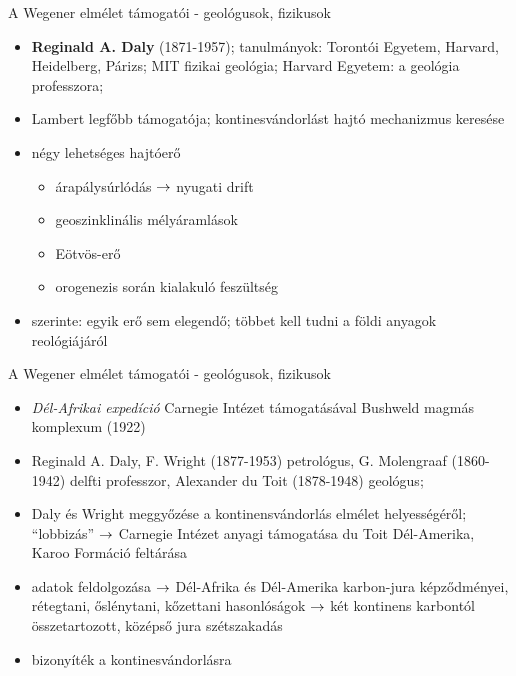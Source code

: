 \documentclass{beamer}
\begin{document}
\begin{frame}{A Wegener elmélet támogatói - geológusok, fizikusok}
    \begin{itemize}
        \item \textbf{Reginald A. Daly} (1871-1957); tanulmányok: Torontói Egyetem, Harvard, Heidelberg, Párizs; MIT fizikai geológia; Harvard Egyetem: a geológia professzora;
        \item Lambert legfőbb támogatója; kontinesvándorlást hajtó mechanizmus keresése
        \item négy lehetséges hajtóerő
        \begin{itemize}
            \item árapálysúrlódás $\rightarrow$ nyugati drift
            \item geoszinklinális mélyáramlások
            \item Eötvös-erő
            \item orogenezis során kialakuló feszültség
        \end{itemize}
        \item szerinte: egyik erő sem elegendő; többet kell tudni a földi anyagok reológiájáról
    \end{itemize}
\end{frame}

\begin{frame}{A Wegener elmélet támogatói - geológusok, fizikusok}
    \begin{itemize}
        \item \textit{Dél-Afrikai expedíció} Carnegie Intézet támogatásával Bushweld magmás komplexum (1922)
        \item Reginald A. Daly, F. Wright (1877-1953) petrológus, G. Molengraaf (1860-1942) delfti professzor, Alexander du Toit (1878-1948) geológus;
        \item Daly és Wright meggyőzése a kontinensvándorlás elmélet helyességéről; ``lobbizás'' $\rightarrow$ Carnegie Intézet anyagi támogatása du Toit Dél-Amerika, Karoo Formáció feltárása
        \item adatok feldolgozása $\rightarrow$ Dél-Afrika és Dél-Amerika karbon-jura képződményei, rétegtani, őslénytani, kőzettani hasonlóságok $\rightarrow$ két kontinens karbontól összetartozott, középső jura szétszakadás
        \item bizonyíték a kontinesvándorlásra
    \end{itemize}
\end{frame}
\end{document}
